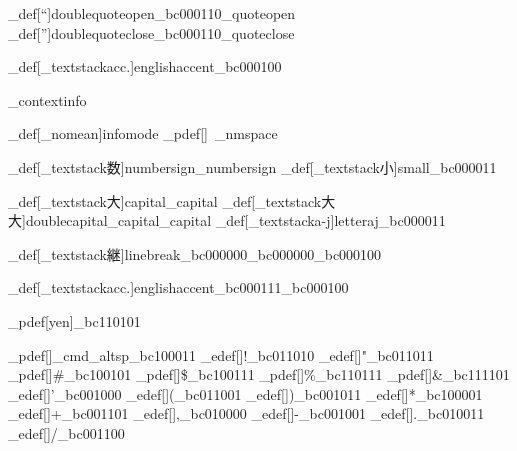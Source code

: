 \brl@char_def[“]{doublequoteopen}{\brl@char_bc000110\brl@char@alias_quoteopen}
\brl@char_def[”]{doublequoteclose}{\brl@char_bc000110\brl@char@alias_quoteclose}


\brl@char_def[\brl@char_textstack{acc.}{}]{englishaccent}{\brl@char_bc000100}




\brl@char_context{info}

\brl@char_def[\brl@char_nomean]{infomode}{}
\brl@char_pdef[]{\ }{\brl@char@alias_nmspace}%

\brl@char_def[\brl@char_textstack{数}{}]{numbersign}{\brl@char@alias_numbersign}
\brl@char_def[\brl@char_textstack{小}{}]{small}{\brl@char_bc000011}

\brl@char_def[\brl@char_textstack{大}{}]{capital}{\brl@char@alias_capital}
\brl@char_def[\brl@char_textstack{大大}{}]{doublecapital}{\brl@char@alias_capital\brl@char@alias_capital}
\brl@char_def[\brl@char_textstack{a-j}{}]{letteraj}{\brl@char_bc000011}

\brl@char_def[\brl@char_textstack{継}{}]{linebreak}{\brl@char_bc000000\brl@char_bc000000\brl@char_bc000100}

\brl@char_def[\brl@char_textstack{acc.}{}]{englishaccent}{\brl@char_bc000111\brl@char_bc000100}

\brl@char_pdef[yen]{\yen}{\brl@char_bc110101}%



\brl@char_pdef[]{\brl@info_cmd_altsp}{\brl@char_bc100011}
\brl@char_edef[]{!}{\brl@char_bc011010}
\brl@char_edef[]{"}{\brl@char_bc011011}
\brl@char_pdef[]{\#}{\brl@char_bc100101}
\brl@char_pdef[]{\$}{\brl@char_bc100111}
\brl@char_pdef[]{\%}{\brl@char_bc110111}
\brl@char_pdef[]{\&}{\brl@char_bc111101}
\brl@char_edef[]{'}{\brl@char_bc001000}
\brl@char_edef[]{(}{\brl@char_bc011001}
\brl@char_edef[]{)}{\brl@char_bc001011}
\brl@char_edef[]{*}{\brl@char_bc100001}
\brl@char_edef[]{+}{\brl@char_bc001101}
\brl@char_edef[]{,}{\brl@char_bc010000}
\brl@char_edef[]{-}{\brl@char_bc001001}
\brl@char_edef[]{.}{\brl@char_bc010011}
\brl@char_edef[]{/}{\brl@char_bc001100}

